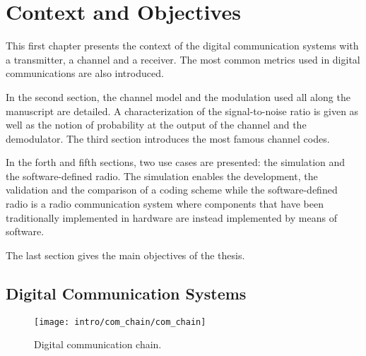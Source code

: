 
\graphicspath{{main/chapter1/fig/}}

\chapter{Context and Objectives}
\label{chap:ctx}

This first chapter presents the context of the digital communication systems
with a transmitter, a channel and a receiver. The most common metrics used
in digital communications are also introduced.

In the second section, the channel model and the modulation used all along
the manuscript are detailed. A characterization of the signal-to-noise ratio is
given as well as the notion of probability at the output of the channel and the
demodulator. The third section introduces the most famous channel codes.

In the forth and fifth sections, two use cases are presented: the simulation and
the software-defined radio. The simulation enables the development, the
validation and the comparison of a coding scheme while the software-defined
radio is a radio communication system where components that have been
traditionally implemented in hardware are instead implemented by means of
software.

The last section gives the main objectives of the thesis.

\vspace*{\fill}
\minitoccustom
\vspace*{\fill}

\section{Digital Communication Systems}
\label{sec:ctx_digital_communication_systems}

\begin{figure}[htp]
  \centering
  \texttt{[image: intro/com\_chain/com\_chain]}
  \caption{Digital communication chain.}
  \label{fig:intro_com_chain}
\end{figure}

